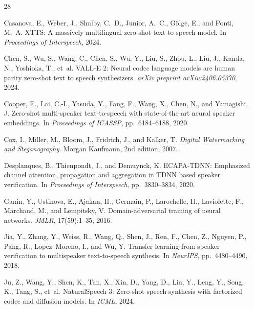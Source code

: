 \documentclass[11pt,a4paper]{article}
\begin{document}
\begin{thebibliography}{28}

Casanova, E., Weber, J., Shulby, C.~D., Junior, A.~C., G{\"o}lge, E., and Ponti, M.~A.
\newblock XTTS: A massively multilingual zero-shot text-to-speech model.
\newblock In \emph{Proceedings of Interspeech}, 2024.

Chen, S., Wu, S., Wang, C., Chen, S., Wu, Y., Liu, S., Zhou, L., Liu, J., Kanda, N., Yoshioka, T., et~al.
\newblock VALL-E 2: Neural codec language models are human parity zero-shot text to speech synthesizers.
\newblock \emph{arXiv preprint arXiv:2406.05370}, 2024.

Cooper, E., Lai, C.-I., Yasuda, Y., Fang, F., Wang, X., Chen, N., and Yamagishi, J.
\newblock Zero-shot multi-speaker text-to-speech with state-of-the-art neural speaker embeddings.
\newblock In \emph{Proceedings of ICASSP}, pp.\ 6184--6188, 2020.

Cox, I., Miller, M., Bloom, J., Fridrich, J., and Kalker, T.
\newblock \emph{Digital Watermarking and Steganography}.
\newblock Morgan Kaufmann, 2nd edition, 2007.

Desplanques, B., Thienpondt, J., and Demuynck, K.
\newblock ECAPA-TDNN: Emphasized channel attention, propagation and aggregation in TDNN based speaker verification.
\newblock In \emph{Proceedings of Interspeech}, pp.\ 3830--3834, 2020.

Ganin, Y., Ustinova, E., Ajakan, H., Germain, P., Larochelle, H., Laviolette, F., Marchand, M., and Lempitsky, V.
\newblock Domain-adversarial training of neural networks.
\newblock \emph{JMLR}, 17(59):1--35, 2016.

Jia, Y., Zhang, Y., Weiss, R., Wang, Q., Shen, J., Ren, F., Chen, Z., Nguyen, P., Pang, R., Lopez~Moreno, I., and Wu, Y.
\newblock Transfer learning from speaker verification to multispeaker text-to-speech synthesis.
\newblock In \emph{NeurIPS}, pp.\ 4480--4490, 2018.

Ju, Z., Wang, Y., Shen, K., Tan, X., Xin, D., Yang, D., Liu, Y., Leng, Y., Song, K., Tang, S., et~al.
\newblock NaturalSpeech 3: Zero-shot speech synthesis with factorized codec and diffusion models.
\newblock In \emph{ICML}, 2024.


\end{thebibliography}
\end{document}
